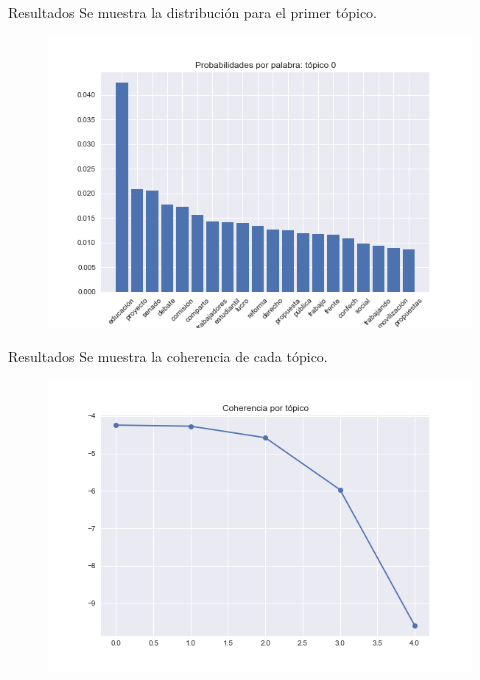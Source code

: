 \documentclass{beamer}
\begin{document}
	\begin{frame}{Resultados}
		Se muestra la distribución para el primer tópico.
		\begin{figure}[h]
			\includegraphics[scale=.4]{../imgs/segunda_avance/boric_barplot0.png}
		\end{figure}
	\end{frame}

	
	\begin{frame}{Resultados}
		Se muestra la coherencia de cada tópico.
		\begin{figure}[h]
			\includegraphics[scale=.4]{../imgs/segunda_avance/boric_topic_coherence.png}
		\end{figure}
	\end{frame}
\end{document}
